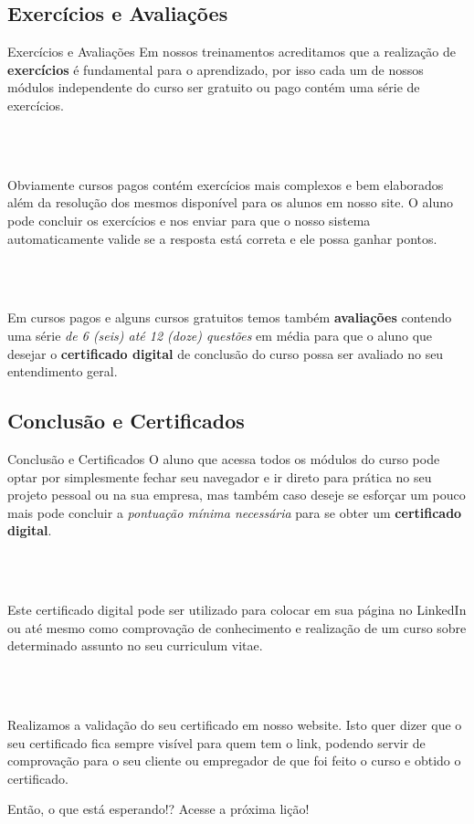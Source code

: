 \documentclass{beamer}
\begin{document}
\subsection[]{Exercícios e Avaliações}

\begin{frame}{Exercícios e Avaliações}
  Em nossos treinamentos acreditamos que a realização de \textbf{exercícios} é fundamental
  para o aprendizado, por isso cada um de nossos módulos independente do curso ser
  gratuito ou pago contém uma série de exercícios.

  \\~\

  Obviamente cursos pagos contém exercícios mais complexos e bem elaborados além
  da resolução dos mesmos disponível para os alunos em nosso site. O aluno pode
  concluir os exercícios e nos enviar para que o nosso sistema automaticamente
  valide se a resposta está correta e ele possa ganhar pontos.

  \\~\

  Em cursos pagos e alguns cursos gratuitos temos também \textbf{avaliações} contendo uma
  série \textit{de 6 (seis) até 12 (doze) questões} em média para que o aluno que desejar
  o \textbf{certificado digital} de conclusão do curso possa ser avaliado no seu entendimento
  geral.
\end{frame}

\subsection[]{Conclusão e Certificados}

\begin{frame}[fragile]{Conclusão e Certificados}
  O aluno que acessa todos os módulos do curso pode optar por simplesmente fechar
  seu navegador e ir direto para prática no seu projeto pessoal ou na sua empresa,
  mas também caso deseje se esforçar um pouco mais pode concluir a \textit{pontuação mínima
  necessária} para se obter um \textbf{certificado digital}.

  \\~\

  Este certificado digital pode ser utilizado para colocar em sua página no LinkedIn
  ou até mesmo como comprovação de conhecimento e realização de um curso sobre
  determinado assunto no seu curriculum vitae.

  \\~\

  Realizamos a validação do seu certificado em nosso website. Isto quer dizer que
  o seu certificado fica sempre visível para quem tem o link, podendo servir de
  comprovação para o seu cliente ou empregador de que foi feito o curso e obtido
  o certificado.

\end{frame}

\begin{frame}{}
  \begin{center}
    \vfill
    \Huge{Então, o que está esperando!?}
    \vfill
    \Huge{Acesse a próxima lição!}
    \vfill
  \end{center}
\end{frame}
\end{document}
